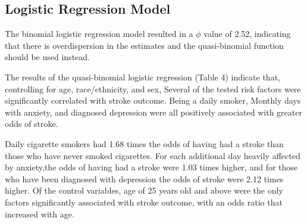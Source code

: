 \documentclass[11pt,]{article}
\begin{document}
\subsection{Logistic Regression
Model}\label{logistic-regression-model-1}

The binomial logistic regression model resulted in a \(\phi\) value of
2.52, indicating that there is overdispersion in the estimates and the
quasi-binomial function should be used instead.

The results of the quasi-binomial logistic regression (Table 4) indicate
that, controlling for age, race/ethnicity, and sex, Several of the
tested risk factors were significantly correlated with stroke outcome.
Being a daily smoker, Monthly days with anxiety, and diagnosed
depression were all positively associated with greater odds of stroke.

Daily cigarette smokers had 1.68 times the odds of having had a stroke
than those who have never smoked cigarettes. For each additional day
heavily affected by anxiety,the odds of having had a stroke were 1.03
times higher, and for those who have been diagnosed with depression the
odds of stroke were 2.12 times higher. Of the control variables, age of
25 years old and above were the only factors significantly associated
with stroke outcome, with an odds ratio that increased with age.
\end{document}
